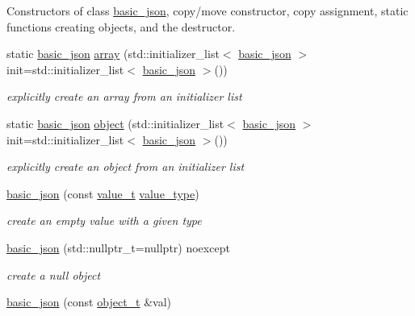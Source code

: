 Constructors of class \hyperlink{classnlohmann_1_1basic__json}{basic\+\_\+json}, copy/move constructor, copy assignment, static functions creating objects, and the destructor. \begin{DoxyCompactItemize}
\item 
static \hyperlink{classnlohmann_1_1basic__json}{basic\+\_\+json} \hyperlink{classnlohmann_1_1basic__json_a5685815624b086caa532f41e853d4b0f}{array} (std\+::initializer\+\_\+list$<$ \hyperlink{classnlohmann_1_1basic__json}{basic\+\_\+json} $>$ init=std\+::initializer\+\_\+list$<$ \hyperlink{classnlohmann_1_1basic__json}{basic\+\_\+json} $>$())
\begin{DoxyCompactList}\small\item\em explicitly create an array from an initializer list \end{DoxyCompactList}\item 
static \hyperlink{classnlohmann_1_1basic__json}{basic\+\_\+json} \hyperlink{classnlohmann_1_1basic__json_ad25b2f8c21e241e2d63455537a9294ff}{object} (std\+::initializer\+\_\+list$<$ \hyperlink{classnlohmann_1_1basic__json}{basic\+\_\+json} $>$ init=std\+::initializer\+\_\+list$<$ \hyperlink{classnlohmann_1_1basic__json}{basic\+\_\+json} $>$())
\begin{DoxyCompactList}\small\item\em explicitly create an object from an initializer list \end{DoxyCompactList}\item 
\hyperlink{classnlohmann_1_1basic__json_a8f77085bd98c97a983d9ba12efbf6148}{basic\+\_\+json} (const \hyperlink{classnlohmann_1_1basic__json_a231b02148577b69a154b2ce2c87a5522}{value\+\_\+t} \hyperlink{classnlohmann_1_1basic__json_ac8d45b57874b4a6e9c07f7d3b5daa1f9}{value\+\_\+type})
\begin{DoxyCompactList}\small\item\em create an empty value with a given type \end{DoxyCompactList}\item 
\hyperlink{classnlohmann_1_1basic__json_aa7ad0ebda83e54c22ba8b3d954ef1293}{basic\+\_\+json} (std\+::nullptr\+\_\+t=nullptr) noexcept
\begin{DoxyCompactList}\small\item\em create a null object \end{DoxyCompactList}\item 
\hyperlink{classnlohmann_1_1basic__json_a9af5ea68c88f423ddf35216aff7f1813}{basic\+\_\+json} (const \hyperlink{classnlohmann_1_1basic__json_a0ac9894c9de8dc551cf2e5f1c605537f}{object\+\_\+t} \&val)

\end{DoxyCompactItemize}
